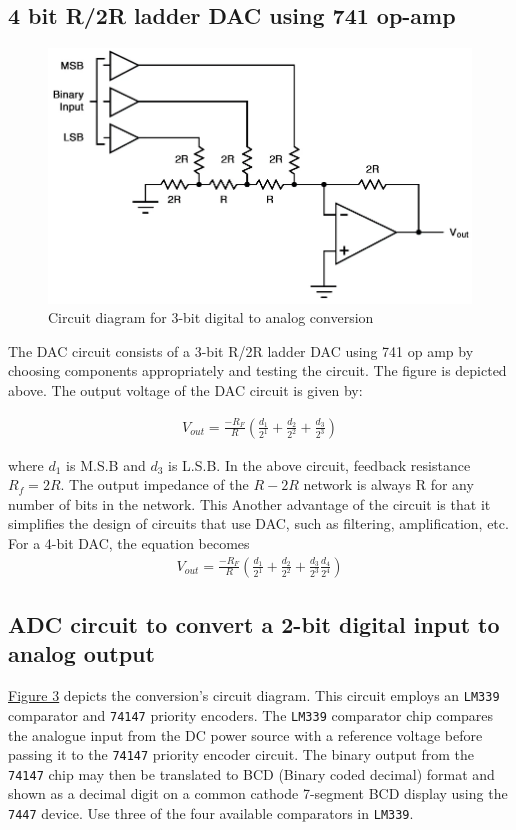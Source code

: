 \subsection{4 bit R/2R ladder DAC using 741 op-amp}
\begin{figure}[H]
    \centering
    \includegraphics[width=1\columnwidth]{images/th1.png}
    \caption{ Circuit diagram for 3-bit digital to analog conversion }
    \label{obj:1}
\end{figure}
The DAC circuit consists of a 3-bit R/2R ladder DAC using 741 op amp by choosing components appropriately and testing the circuit. The figure is depicted above. The output voltage of the DAC circuit is given by:
		
\begin{align}\label{eq1} V_{out} = \frac{-R_F}{R}\left( \frac{d_1}{2^1} + \frac{d_2}{2^2} + \frac{d_3}{2^3} \right)\end{align}

where $d_1$ is M.S.B and $d_3$ is L.S.B. In the above circuit, feedback resistance $R_f=2R$. The output impedance of the $R-2R$ network is always R for any number of bits in the network. This Another advantage of the circuit is that it simplifies the design of circuits that use DAC, such as filtering, amplification, etc. For a 4-bit DAC, the equation becomes
\begin{align}\label{eq2} V_{out} = \frac{-R_F}{R}\left( \frac{d_1}{2^1} + \frac{d_2}{2^2} + \frac{d_3}{2^3} \frac{d_4}{2^4} \right)\end{align}

\subsection{ADC circuit to convert a 2-bit digital input to analog output}
\hyperref[obj:2]{Figure 3} depicts the conversion's circuit diagram. This circuit employs an \verb|LM339| comparator and \verb|74147| priority encoders. The \verb|LM339| comparator chip compares the analogue input from the DC power source with a reference voltage before passing it to the \verb|74147| priority encoder circuit. The binary output from the \verb|74147| chip may then be translated to BCD (Binary coded decimal) format and shown as a decimal digit on a common cathode 7-segment BCD display using the \verb|7447| device. Use three of the four available comparators in \verb|LM339|.

